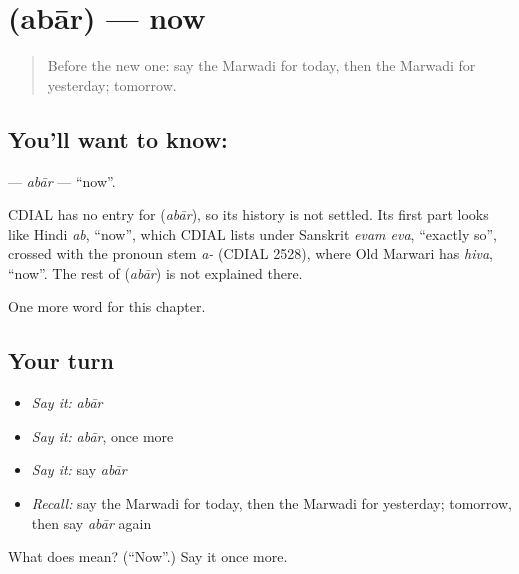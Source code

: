\section[\texorpdfstring{\mw{अबार} (abār)}{अबार (abār)}]{ (abār) — now}

\label{lesson:MW-C79-abar}



\begin{quote}
Before the new one: say the Marwadi for today, then the Marwadi for yesterday; tomorrow.
\end{quote}

\subsection*{You'll want to know: }
\textbf{} — \emph{abār} — \textquotedblleft{}now\textquotedblright{}.

\begin{cousinweb}
CDIAL has no entry for \textbf{} (\emph{abār}), so its history is not settled. Its first part looks like Hindi \emph{ab}, \textquotedblleft{}now\textquotedblright{}, which CDIAL lists under Sanskrit \emph{evam eva}, \textquotedblleft{}exactly so\textquotedblright{}, crossed with the pronoun stem \emph{a-} (CDIAL 2528), where Old Marwari has \emph{hiva}, \textquotedblleft{}now\textquotedblright{}. The rest of \textbf{} (\emph{abār}) is not explained there.
\end{cousinweb}

\begin{grammarlens}[title={What you've built}]
One more word for this chapter.
\end{grammarlens}

\subsection*{Your turn}
\begin{itemize}
\raggedright
  \item \emph{Say it:} \emph{abār}
  \item \emph{Say it:} \emph{abār}, once more
  \item \emph{Say it:} say \emph{abār}
  \item \emph{Recall:} say the Marwadi for today, then the Marwadi for yesterday; tomorrow, then say \emph{abār} again
\end{itemize}

\begin{tcolorbox}[breakable,colback=teal!4,colframe=teal!35!black,title={Before you move on}]
What does  mean? (\textquotedblleft{}Now\textquotedblright{}.) Say it once more.
\end{tcolorbox}
